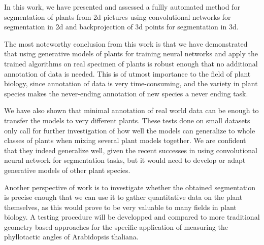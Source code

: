 In this work, we have presented and assessed a fullly automated method for segmentation of
plants from 2d pictures using convolutional networks for segmentation in 2d and
backprojection of 3d points for segmentation in 3d.

The most noteworthy conclusion from this work is that we have demonstrated that using generative
models of plants for training neural networks and apply the trained algorithms
on real specimen of plants is robust enough that no additional annotation of
data is needed. This is of utmost importance to the field of plant biology, since annotation of data
is very time-consuming, and the variety in plant species makes
the never-ending annotation of new species a never ending task.

We have also shown that minimal annotation of real world data can be enough to
transfer the models to very different plants. These tests done on small datasets
only call for further investigation of how well the models can generalize to whole
classes of plants when mixing several plant models together. We are confident
that they indeed generalize well, given the recent successes in using
convolutional neural network for segmentation tasks, but it would need to
develop or adapt generative models of other plant species.

Another perspective of work is to investigate whether the obtained segmentation is precise
enough that we can use it to gather quantitative data on the plant themselves,
as this would prove to be very valuable to many fields in plant biology. A
testing procedure will be developped and compared to more traditional geometry
based approaches for the specific application of measuring the phyllotactic
angles of Arabidopsis thaliana.
